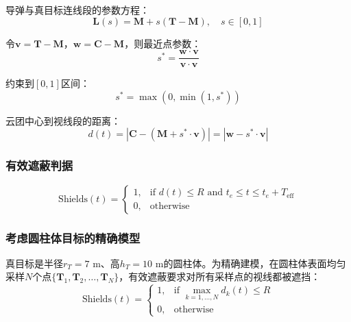 \documentclass[12pt,a4paper]{article}
\newcommand{\vect}[1]{\boldsymbol{#1}}
\begin{document}
导弹与真目标连线段的参数方程：
\begin{equation}
    \vect{L}(s) = \vect{M} + s(\vect{T} - \vect{M}), \quad s \in [0, 1]
\end{equation}

令$\vect{v} = \vect{T} - \vect{M}$，$\vect{w} = \vect{C} - \vect{M}$，则最近点参数：
\begin{equation}
    s^* = \frac{\vect{w} \cdot \vect{v}}{\vect{v} \cdot \vect{v}}
    \label{eq:s_star}
\end{equation}

约束到$[0, 1]$区间：
\begin{equation}
    s^* = \max(0, \min(1, s^*))
\end{equation}

云团中心到视线段的距离：
\begin{equation}
    d(t) = |\vect{C} - (\vect{M} + s^* \cdot \vect{v})| = |\vect{w} - s^* \cdot \vect{v}|
    \label{eq:shield_distance}
\end{equation}

\subsubsection{有效遮蔽判据}

\begin{equation}
    \text{Shields}(t) = \begin{cases}
        1, & \text{if } d(t) \leq R \text{ and } t_e \leq t \leq t_e + T_{\text{eff}} \\
        0, & \text{otherwise}
    \end{cases}
    \label{eq:shield_condition}
\end{equation}

\subsubsection{考虑圆柱体目标的精确模型}

真目标是半径$r_T = 7$ m、高$h_T = 10$ m的圆柱体。为精确建模，在圆柱体表面均匀采样$N$个点$\{\vect{T}_1, \vect{T}_2, \ldots, \vect{T}_N\}$，有效遮蔽要求对所有采样点的视线都被遮挡：
\begin{equation}
    \text{Shields}(t) = \begin{cases}
        1, & \text{if } \max_{k=1,\ldots,N} d_k(t) \leq R \\
        0, & \text{otherwise}
    \end{cases}
    \label{eq:shield_cylinder}
\end{equation}
\end{document}

